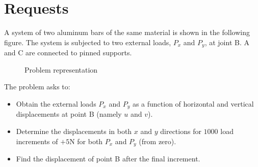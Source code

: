 \section{Requests}
\label{sec:requests}

A system of two aluminum bars of the same material is shown in the following figure.
The system is subjected to two external loads, $P_x$ and $P_y$, at joint B.
A and C are connected to pinned supports.

\begin{figure}[h]
    \centering
    \caption{Problem representation}
    \label{fig:problem_representation}
\end{figure}

The problem asks to:

\begin{itemize}
    \item Obtain the external loads $P_x$ and $P_y$ as a function of horizontal and vertical displacements at point B (namely $u$ and $v$).
    \item Determine the displacements in both $x$ and $y$ directions for $1000$ load increments of $+5\text{N}$ for both $P_x$ and $P_y$ (from zero).
    \item Find the displacement of point B after the final increment.
\end{itemize}

